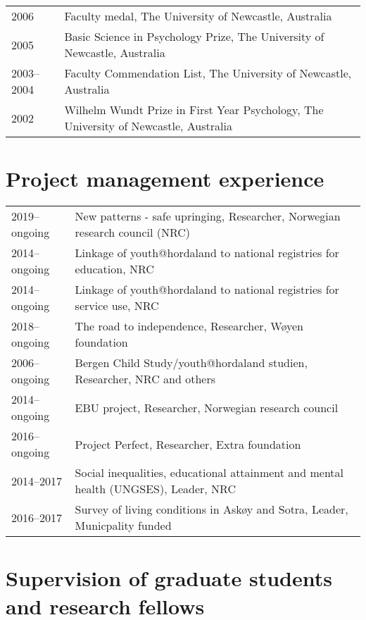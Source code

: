 \documentclass[11pt,a4paper,a4paper]{article}
\begin{document}
\begin{tabular}{ll}
  2006 & Faculty medal, The University of Newcastle, Australia \\ 
  2005 & Basic Science in Psychology Prize, The University of Newcastle, Australia \\ 
  2003--2004 & Faculty Commendation List, The University of Newcastle, Australia \\ 
  2002 & Wilhelm Wundt Prize in First Year Psychology, The University of Newcastle, Australia \\ 
  \end{tabular}

\hypertarget{project-management-experience}{%
\section{Project management experience}\label{project-management-experience}}

\begin{tabular}{ll}
  2019--ongoing & New patterns - safe upringing, Researcher, Norwegian research council (NRC) \\ 
  2014--ongoing & Linkage of youth@hordaland to national registries for education, NRC \\ 
  2014--ongoing & Linkage of youth@hordaland to national registries for service use, NRC \\ 
  2018--ongoing & The road to independence, Researcher, Wøyen foundation \\ 
  2006--ongoing & Bergen Child Study/youth@hordaland studien, Researcher, NRC and others \\ 
  2014--ongoing & EBU project, Researcher, Norwegian research council \\ 
  2016--ongoing & Project Perfect, Researcher, Extra foundation \\ 
  2014--2017 & Social inequalities, educational attainment and mental health (UNGSES), Leader, NRC \\ 
  2016--2017 & Survey of living conditions in Askøy and Sotra, Leader, Municpality funded \\ 
  \end{tabular}

\hypertarget{supervision-of-graduate-students-and-research-fellows}{%
\section{Supervision of graduate students and research fellows}\label{supervision-of-graduate-students-and-research-fellows}}
\end{document}
